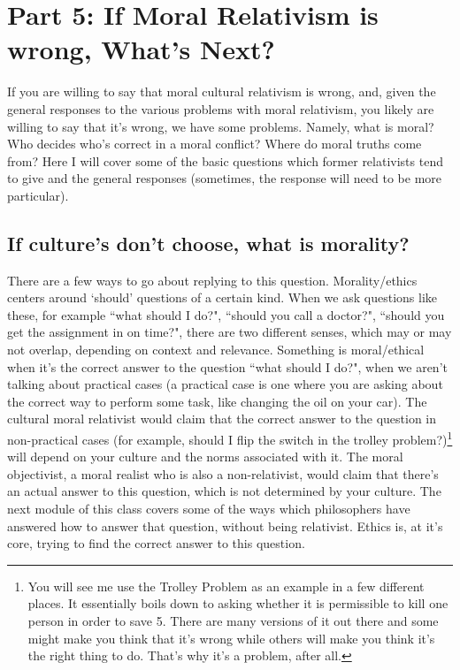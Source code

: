 \chapter{Part 5: If Moral Relativism is wrong, What's Next?}

If you are willing to say that moral cultural relativism is wrong, and, given the general responses to the various problems with moral relativism, you likely are willing to say that it's wrong, we have some problems. Namely, what is moral? Who decides who's correct in a moral conflict? Where do moral truths come from? Here I will cover some of the basic questions which former relativists tend to give and the general responses (sometimes, the response will need to be more particular).
\section{If culture's don't choose, what is morality?}

There are a few ways to go about replying to this question. Morality/ethics centers around `should' questions of a certain kind. When we ask questions like these, for example ``what should I do?", ``should you call a doctor?", ``should you get the assignment in on time?",  there are two different senses, which may or may not overlap, depending on context and relevance. Something is moral/ethical when it's the correct answer to the question ``what should I do?", when we aren't talking about practical cases (a practical case is one where you are asking about the correct way to perform some task, like changing the oil on your car). The cultural moral relativist would claim that the correct answer to the question in non-practical cases (for example, should I flip the switch in the trolley problem?)\footnote{You will see me use the Trolley Problem as an example in a few different places. It essentially boils down to asking whether it is permissible to kill one person in order to save 5. There are many versions of it out there and some might make you think that it's wrong while others will make you think it's the right thing to do. That's why it's a problem, after all.} will depend on your culture and the norms associated with it. The moral objectivist, a moral realist who is also a non-relativist, would claim that there's an actual answer to this question, which is not determined by your culture. The next module of this class covers some of the ways which philosophers have answered how to answer that question, without being relativist. Ethics is, at it's core, trying to find the correct answer to this question.

